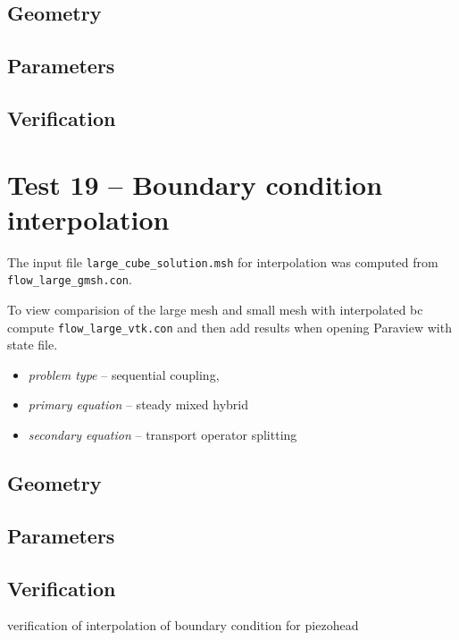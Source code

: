 \subsection*{Geometry}

\subsection*{Parameters}

\subsection*{Verification}



\section{Test 19 -- Boundary condition interpolation}

The input file \verb'large_cube_solution.msh' for interpolation was computed from \verb'flow_large_gmsh.con'.

To view comparision of the large mesh and small mesh with interpolated bc
compute \verb'flow_large_vtk.con' and then add results when opening Paraview with state file.

\begin{itemize} 
    \item \emph{problem type} -- sequential coupling, 
    \item \emph{primary equation} -- steady mixed hybrid
    \item \emph{secondary equation} -- transport operator splitting
  \end{itemize}

\subsection*{Geometry}


\subsection*{Parameters}

\subsection*{Verification}
verification of interpolation of boundary condition for piezohead



